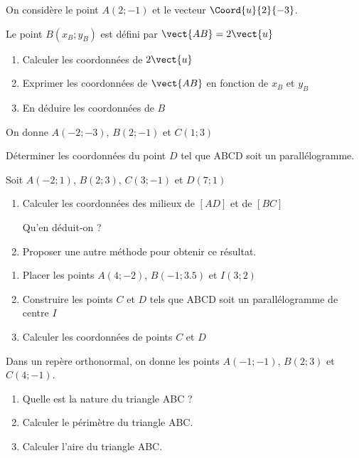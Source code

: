 


\exo 

On considère le point $A(2 ; -1)$ et le vecteur $\Coord{u}{2}{-3}$.

Le point $B(x_B ; y_B)$ est défini par $\vect{AB}=2\vect{u}$

\begin{enumerate}
\item Calculer les coordonnées de $2\vect{u}$
\item Exprimer les coordonnées de $\vect{AB}$ en fonction de $x_B$ et $y_B$
\item En déduire les coordonnées de $B$
\end{enumerate}

\medskip

\exo

On donne $A(-2 ; -3)$, $B(2 ; -1)$ et $C(1 ; 3)$

Déterminer les coordonnées du point $D$ tel que ABCD soit un parallélogramme.

\medskip

\exo

Soit $A(-2 ; 1)$, $B(2 ; 3)$, $C(3 ;-1)$ et $D(7 ;1)$

\begin{enumerate}
\item Calculer les coordonnées des milieux de $[AD]$ et de $[BC]$

Qu'en déduit-on ?
\item Proposer une autre méthode pour obtenir ce résultat.
\end{enumerate}
\exo
 
\begin{enumerate}
\item Placer les points $A(4 ; -2)$, $B(-1 ; 3.5)$ et $I(3;2)$
\item Construire les points $C$ et $D$ tels que ABCD soit un parallélogramme de centre $I$
\item Calculer les coordonnées de points $C$ et $D$
\end{enumerate}

\medskip

\exo 

Dans un repère orthonormal, on donne les points $A(-1 ; -1)$, $B(2 ; 3)$ et $C(4 ; -1)$.

\begin{enumerate}
\item Quelle est la nature du triangle ABC ?
\item Calculer le périmètre du triangle ABC.
\item Calculer l'aire du triangle ABC.
\end{enumerate}

